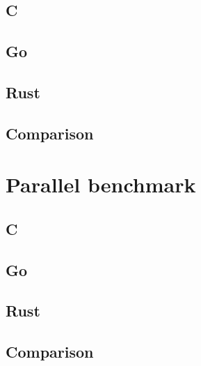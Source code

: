 \subsection{C}
\label{subsec:Implementation::SequentialBenchmark::C}



\subsection{Go}
\label{subsec:Implementation::SequentialBenchmark::Go}


\subsection{Rust}
\label{subsec:Implementation::SequentialBenchmark::Rust}


\subsection{Comparison}
\label{subsec:Implementation::SequentialBenchmark::Comparison}



\section{Parallel benchmark}
\label{sec:Implementation::ParallelBenchmark}



\subsection{C}
\label{subsec:Implementation::ParallelBenchmark::C}


\subsection{Go}
\label{subsec:Implementation::ParallelBenchmark::Go}


\subsection{Rust}
\label{subsec:Implementation::ParallelBenchmark::Rust}


\subsection{Comparison}
\label{subsec:Implementation::ParallelBenchmark::Comparison}
